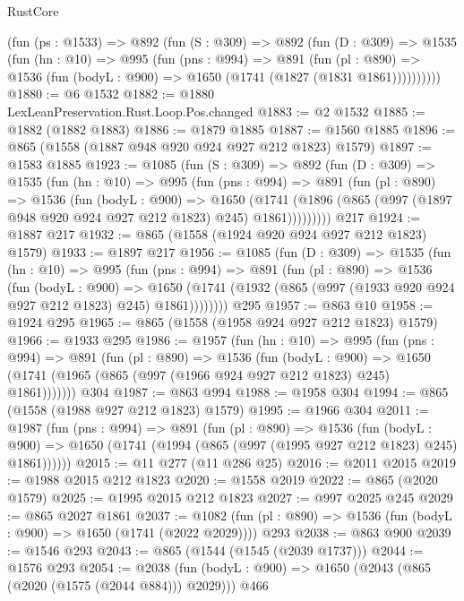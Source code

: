 \begin{lexlean}{RustCore}
\begin{coremodule}
{\begin{coremodule}
{{{{{{{{    (fun (ps : @1533) =>
    @892
      (fun (S : @309) =>
      @892
        (fun (D : @309) =>
        @1535
          (fun (hn : @10) =>
          @995
            (fun (pns : @994) =>
            @891
              (fun (pl : @890) =>
              @1536 (fun (bodyL : @900) => @1650 (@1741 (@1827 (@1831 @1861))))))))))
@1880 := @6 @1532
@1882 := @1880 LexLeanPreservation.Rust.Loop.Pos.changed
@1883 := @2 @1532
@1885 := @1882 (@1882 @1883)
@1886 := @1879 @1885
@1887 := @1560 @1885
@1896 := @865 (@1558 (@1887 @948 @920 @924 @927 @212 @1823) @1579)
@1897 := @1583 @1885
@1923 := @1085
    (fun (S : @309) =>
    @892
      (fun (D : @309) =>
      @1535
        (fun (hn : @10) =>
        @995
          (fun (pns : @994) =>
          @891
            (fun (pl : @890) =>
            @1536
              (fun (bodyL : @900) =>
              @1650
                (@1741
                  (@1896 (@865 (@997 (@1897 @948 @920 @924 @927 @212 @1823) @245) @1861)))))))))
    @217
@1924 := @1887 @217
@1932 := @865 (@1558 (@1924 @920 @924 @927 @212 @1823) @1579)
@1933 := @1897 @217
@1956 := @1085
    (fun (D : @309) =>
    @1535
      (fun (hn : @10) =>
      @995
        (fun (pns : @994) =>
        @891
          (fun (pl : @890) =>
          @1536
            (fun (bodyL : @900) =>
            @1650 (@1741 (@1932 (@865 (@997 (@1933 @920 @924 @927 @212 @1823) @245) @1861))))))))
    @295
@1957 := @863 @10
@1958 := @1924 @295
@1965 := @865 (@1558 (@1958 @924 @927 @212 @1823) @1579)
@1966 := @1933 @295
@1986 := @1957
    (fun (hn : @10) =>
    @995
      (fun (pns : @994) =>
      @891
        (fun (pl : @890) =>
        @1536
          (fun (bodyL : @900) =>
          @1650 (@1741 (@1965 (@865 (@997 (@1966 @924 @927 @212 @1823) @245) @1861)))))))
    @304
@1987 := @863 @994
@1988 := @1958 @304
@1994 := @865 (@1558 (@1988 @927 @212 @1823) @1579)
@1995 := @1966 @304
@2011 := @1987
    (fun (pns : @994) =>
    @891
      (fun (pl : @890) =>
      @1536
        (fun (bodyL : @900) =>
        @1650 (@1741 (@1994 (@865 (@997 (@1995 @927 @212 @1823) @245) @1861))))))
@2015 := @11 @277 (@11 @286 @25)
@2016 := @2011 @2015
@2019 := @1988 @2015 @212 @1823
@2020 := @1558 @2019
@2022 := @865 (@2020 @1579)
@2025 := @1995 @2015 @212 @1823
@2027 := @997 @2025 @245
@2029 := @865 @2027 @1861
@2037 := @1082 (fun (pl : @890) => @1536 (fun (bodyL : @900) => @1650 (@1741 (@2022 @2029)))) @293
@2038 := @863 @900
@2039 := @1546 @293
@2043 := @865 (@1544 (@1545 (@2039 @1737)))
@2044 := @1576 @293
@2054 := @2038 (fun (bodyL : @900) => @1650 (@2043 (@865 (@2020 (@1575 (@2044 @884))) @2029))) @466
}}}}}}}}
\end{coremodule}}
\end{coremodule}
\end{lexlean}
